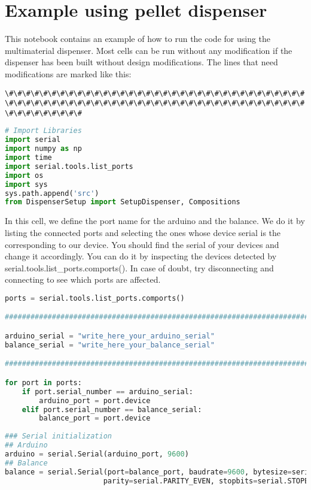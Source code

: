 \section{Example using pellet
dispenser}\label{example-using-pellet-dispenser}

This notebook contains an example of how to run the code for using the
multimaterial dispenser. Most cells can be run without any modification
if the dispenser has been built without design modifications. The lines
that need modifications are marked like this:

\passthrough{\lstinline!\#\#\#\#\#\#\#\#\#\#\#\#\#\#\#\#\#\#\#\#\#\#\#\#\#\#\#\#\#\#\#\#\#\#\#\#\#\#\#\#\#\#\#\#\#\#\#\#\#\#\#\#\#\#\#\#\#\#\#\#\#\#\#\#\#\#\#\#\#\#\#\#\#\#\#\#\#\#\#!}

\begin{lstlisting}[language=Python]
# Import Libraries
import serial
import numpy as np
import time
import serial.tools.list_ports
import os
import sys
sys.path.append('src')
from DispenserSetup import SetupDispenser, Compositions
\end{lstlisting}

In this cell, we define the port name for the arduino and the balance.
We do it by listing the connected ports and selecting the ones whose
device serial is the corresponding to our device. You should find the
serial of your devices and change it accordingly. You can do it by
inspecting the devices detected by serial.tools.list\_ports.comports().
In case of doubt, try disconnecting and connecting to see which ports
are affected.

\begin{lstlisting}[language=Python]
ports = serial.tools.list_ports.comports()

###############################################################################

arduino_serial = "write_here_your_arduino_serial"
balance_serial = "write_here_your_balance_serial"

###############################################################################

for port in ports:
    if port.serial_number == arduino_serial:
        arduino_port = port.device
    elif port.serial_number == balance_serial:
        balance_port = port.device
        
### Serial initialization
## Arduino
arduino = serial.Serial(arduino_port, 9600)
## Balance
balance = serial.Serial(port=balance_port, baudrate=9600, bytesize=serial.SEVENBITS,
                       parity=serial.PARITY_EVEN, stopbits=serial.STOPBITS_ONE)
\end{lstlisting}


